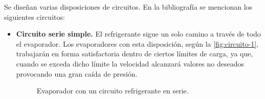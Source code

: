 			Se diseñan varias disposiciones de circuitos. En la bibliografía \cite[Sección 11.12]{dossat2004refrigeracion} se mencionan los siguientes circuitos:
			\begin{itemize}
				\item \textbf{Circuito serie simple.} El refrigerante sigue un solo camino a través de todo el evaporador. Los evaporadores con esta disposición, según la \autoref{fig:circuito-1}, trabajarán en forma satisfactoria dentro de ciertos límites de carga, ya que, cuando se exceda dicho límite la velocidad alcanzará valores no deseados provocando una gran caída de presión.
				\begin{figure}[h]
					\centering
					\caption{Evaporador con un circuito refrigerante en serie.}
					\label{fig:circuito-1}
				\end{figure}
				

\end{itemize}
